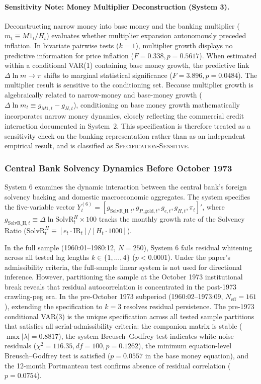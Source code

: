 \paragraph{Sensitivity Note: Money Multiplier Deconstruction (System 3).}
Deconstructing narrow money into base money and the banking multiplier ($m_t \equiv M1_t / H_t$) evaluates whether multiplier expansion autonomously preceded inflation. In bivariate pairwise tests ($k=1$), multiplier growth displays no predictive information for price inflation ($F = 0.338, p = 0.5617$). When estimated within a conditional VAR(1) containing base money growth, the predictive link $\Delta \ln m \to \pi$ shifts to marginal statistical significance ($F = 3.896, p = 0.0484$). The multiplier result is sensitive to the conditioning set. Because multiplier growth is algebraically related to narrow-money and base-money growth ($\Delta \ln m_t \equiv g_{M1,t} - g_{H,t}$), conditioning on base money growth mathematically incorporates narrow money dynamics, closely reflecting the commercial credit interaction documented in System~2. This specification is therefore treated as a sensitivity check on the banking representation rather than as an independent empirical result, and is classified as \textsc{Specification-Sensitive}.

\subsubsection{Central Bank Solvency Dynamics Before October 1973}
\label{sec:granger_solvency_pre73}

System 6 examines the dynamic interaction between the central bank's foreign solvency backing and domestic macroeconomic aggregates. The system specifies the five-variable vector $Y^{(6)}_t = [g_{\text{SolvR\_H},t}, g_{P,\text{gold},t}, g_{e,t}, g_{H,t}, \pi_t]'$, where $g_{\text{SolvR\_H},t} \equiv \Delta \ln \text{SolvR}^H_t \times 100$ tracks the monthly growth rate of the Solvency Ratio ($\text{SolvR}^H_t \equiv [e_t \cdot \text{IR}_t] / [H_t \cdot 1000]$).

In the full sample (1960:01--1980:12, $N=250$), System 6 fails residual whitening across all tested lag lengths $k \in \{1, \dots, 4\}$ ($p < 0.0001$). Under the paper's admissibility criteria, the full-sample linear system is not used for directional inference. However, partitioning the sample at the October 1973 institutional break reveals that residual autocorrelation is concentrated in the post-1973 crawling-peg era. In the pre-October 1973 subperiod (1960:02--1973:09, $N_{\text{eff}} = 161$), extending the specification to $k=3$ resolves residual persistence. The pre-1973 conditional VAR(3) is the unique specification across all tested sample partitions that satisfies all serial-admissibility criteria: the companion matrix is stable ($\max |\lambda| = 0.8817$), the system Breusch--Godfrey test indicates white-noise residuals ($\chi^2 = 116.35, df=100, p = 0.1262$), the minimum equation-level Breusch--Godfrey test is satisfied ($p = 0.0557$ in the base money equation), and the 12-month Portmanteau test confirms absence of residual correlation ($p = 0.0754$).

